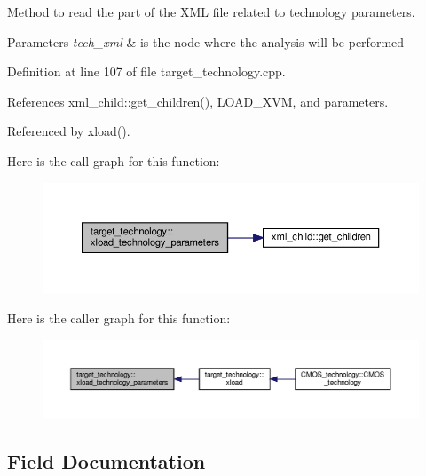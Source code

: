 Method to read the part of the X\+ML file related to technology parameters. 


\begin{DoxyParams}{Parameters}
{\em tech\+\_\+xml} & is the node where the analysis will be performed \\
\hline
\end{DoxyParams}


Definition at line 107 of file target\+\_\+technology.\+cpp.



References xml\+\_\+child\+::get\+\_\+children(), L\+O\+A\+D\+\_\+\+X\+VM, and parameters.



Referenced by xload().

Here is the call graph for this function\+:
\nopagebreak
\begin{figure}[H]
\begin{center}
\leavevmode
\includegraphics[width=350pt]{d8/d05/classtarget__technology_a272517464925f914dae13b88d269e439_cgraph}
\end{center}
\end{figure}
Here is the caller graph for this function\+:
\nopagebreak
\begin{figure}[H]
\begin{center}
\leavevmode
\includegraphics[width=350pt]{d8/d05/classtarget__technology_a272517464925f914dae13b88d269e439_icgraph}
\end{center}
\end{figure}


\subsection{Field Documentation}
\mbox{\label{classtarget__technology_a6d8af451d6dc438c539419db44410329}} 
